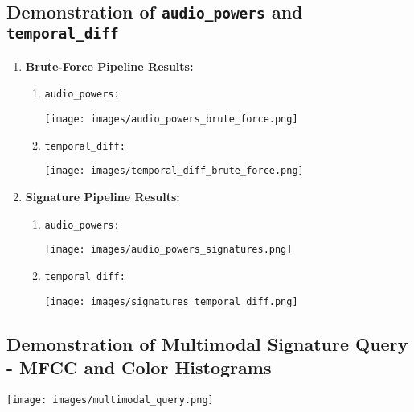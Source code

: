 \documentclass{article}
\begin{document}
\subsection*{Demonstration of \texttt{audio\_powers} and \texttt{temporal\_diff}}
\begin{enumerate}
        \item \textbf{Brute-Force Pipeline Results:} \begin{enumerate}
            \item \texttt{audio\_powers:} 
            \begin{center}
                \texttt{[image: images/audio\_powers\_brute\_force.png]}
            \end{center}
            \item \texttt{temporal\_diff:}
             \begin{center}
                \texttt{[image: images/temporal\_diff\_brute\_force.png]}
            \end{center}
            
        \end{enumerate}
        \item \textbf{Signature Pipeline Results:}\begin{enumerate}
            \item \texttt{audio\_powers:}
            \begin{center}
                \texttt{[image: images/audio\_powers\_signatures.png]}
            \end{center}
            \item \texttt{temporal\_diff:}          \begin{center}
                \texttt{[image: images/signatures\_temporal\_diff.png]}
            \end{center}
        \end{enumerate}
    \end{enumerate}

\subsection*{Demonstration of Multimodal Signature Query - MFCC and Color Histograms}
\begin{center}
        \begin{center}
                \texttt{[image: images/multimodal\_query.png]}
            \end{center}
\end{center}
\end{document}
